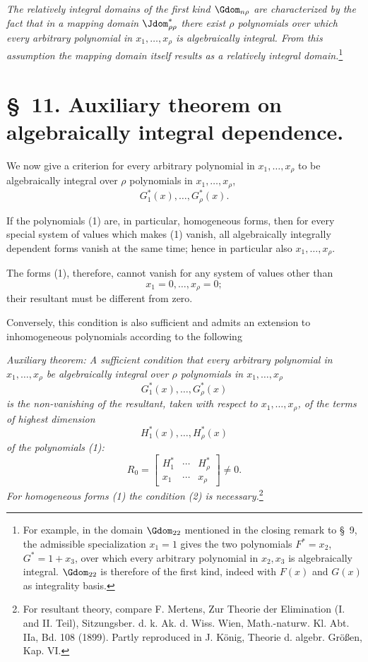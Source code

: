 \documentclass[11pt]{article}
\begin{document}
\emph{The relatively integral domains of the first kind $\Gdom_{n\rho}$ are characterized by the fact that in a mapping domain $\Jdom^*_{\rho\rho}$ there exist $\rho$ polynomials over which every arbitrary polynomial in $x_1,
\ldots,x_\rho$ is algebraically integral. From this assumption the mapping domain itself results as a relatively integral domain.}\footnote{For example, in the domain $\Gdom_{22}$ mentioned in the closing remark to \S\ 9, the admissible specialization $x_1=1$ gives the two polynomials $F^*=x_2$, $G^*=1+x_3$, over which every arbitrary polynomial in $x_2,x_3$ is algebraically integral. $\Gdom_{22}$ is therefore of the first kind, indeed with $F(x)$ and $G(x)$ as integrality basis.}

\section*{\S\ 11. Auxiliary theorem on algebraically integral dependence.}

We now give a criterion for every arbitrary polynomial in $x_1,
\ldots,x_\rho$ to be algebraically integral over $\rho$ polynomials in $x_1,
\ldots,x_\rho$,
\begin{equation}
  G_1^*(x),\ldots,G_\rho^*(x).
\tag{1}
\end{equation}

If the polynomials (1) are, in particular, homogeneous forms, then for every special system of values which makes (1) vanish, all algebraically integrally dependent forms vanish at the same time; hence in particular also $x_1,
\ldots,x_\rho$.

The forms (1), therefore, cannot vanish for any system of values other than
\[
  x_1=0,
  \ldots,
  x_\rho=0;
\]
their resultant must be different from zero.

Conversely, this condition is also sufficient and admits an extension to inhomogeneous polynomials according to the following

\emph{Auxiliary theorem: A sufficient condition that every arbitrary polynomial in $x_1,
\ldots,x_\rho$ be algebraically integral over $\rho$ polynomials in $x_1,
\ldots,x_\rho$}
\[
  G_1^*(x),\ldots,G_\rho^*(x)
\]
\emph{is the non-vanishing of the resultant, taken with respect to $x_1,
\ldots,x_\rho$, of the terms of highest dimension}
\[
  H_1^*(x),\ldots,H_\rho^*(x)
\]
\emph{of the polynomials (1):}
\begin{equation}
  R_0=\left[
  \begin{array}{ccc}
    H_1^*&\cdots&H_\rho^*\\
    x_1&\cdots&x_\rho
  \end{array}
  \right]\ne0.
\tag{2}
\end{equation}
\emph{For homogeneous forms (1) the condition (2) is necessary.}\footnote{For resultant theory, compare F. Mertens, Zur Theorie der Elimination (I. and II. Teil), Sitzungsber. d. k. Ak. d. Wiss. Wien, Math.-naturw. Kl. Abt. IIa, Bd. 108 (1899). Partly reproduced in J. König, Theorie d. algebr. Größen, Kap. VI.}
\end{document}
